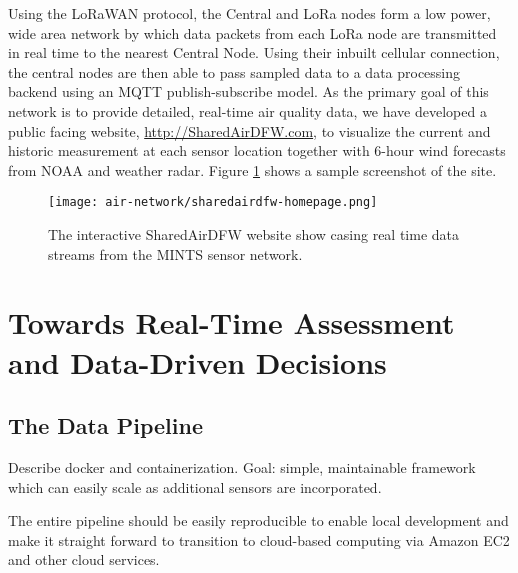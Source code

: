 Using the LoRaWAN protocol, the Central and LoRa nodes form a low power, wide area network by which data packets from each LoRa node are transmitted in real time to the nearest Central Node. Using their inbuilt cellular connection, the central nodes are then able to pass sampled data to a data processing backend using an MQTT publish-subscribe model. As the primary goal of this network is to provide detailed, real-time air quality data, we have developed a public facing website, \url{http://SharedAirDFW.com}, to visualize the current and historic measurement at each sensor location together with 6-hour wind forecasts from NOAA and weather radar. Figure \ref{fig:sharedair-site} shows a sample screenshot of the site.
\begin{figure}[!hbt]
  \centering
  \texttt{[image: air-network/sharedairdfw-homepage.png]}
  \caption{The interactive SharedAirDFW website show casing real time data streams from the MINTS sensor network.}
  \label{fig:sharedair-site}
\end{figure}




\section{Towards Real-Time Assessment and Data-Driven Decisions}


\subsection{The Data Pipeline}

Describe docker and containerization. Goal: simple, maintainable framework which
can easily scale as additional sensors are incorporated.

The entire pipeline should be easily reproducible to enable local development
and make it straight forward to transition to cloud-based computing via Amazon
EC2 and other cloud services.


